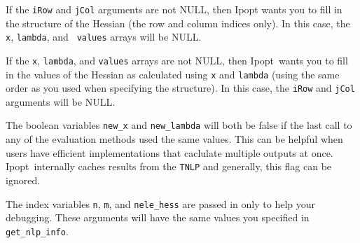 \documentclass[letter,10pt]{article}
\newcommand{\Ipopt}{{\sc Ipopt}}
\begin{document}
If the {\tt iRow} and {\tt jCol} arguments are not NULL, then \Ipopt
wants you to fill in the structure of the Hessian (the row and column
indices only). In this case, the {\tt x}, {\tt lambda}, and {\tt
values} arrays will be NULL.

If the {\tt x}, {\tt lambda}, and {\tt values} arrays are not NULL,
then \Ipopt\ wants you to fill in the values of the Hessian as
calculated using {\tt x} and {\tt lambda} (using the same order as you
used when specifying the structure). In this case, the {\tt iRow} and
{\tt jCol} arguments will be NULL.

The boolean variables {\tt new\_x} and {\tt new\_lambda} will both be
false if the last call to any of the evaluation methods used the same
values. This can be helpful when users have efficient implementations
that caclulate multiple outputs at once. \Ipopt\ internally caches
results from the {\tt TNLP} and generally, this flag can be ignored.

The index variables {\tt n}, {\tt m}, and {\tt nele\_hess} are passed
in only to help your debugging. These arguments will have the same
values you specified in {\tt get\_nlp\_info}.
\end{document}
